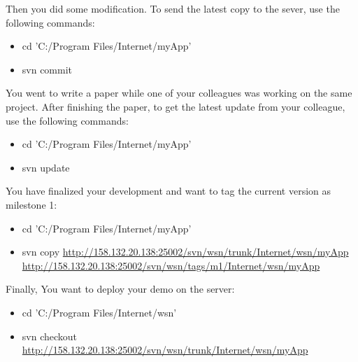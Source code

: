 Then you did some modification. To send the latest copy to the sever, use the following commands:
\begin{itemize}
\item cd 'C:/Program Files/Internet/myApp'
\item svn commit
\end{itemize}

You went to write a paper while one of your colleagues was working on the same project. After finishing the paper, to get the latest update from your colleague, use the following commands:
\begin{itemize}
\item cd 'C:/Program Files/Internet/myApp'
\item svn update
\end{itemize}

You have finalized your development and want to tag the current version as milestone 1:
\begin{itemize}
\item cd 'C:/Program Files/Internet/myApp'
\item svn copy \url{http://158.132.20.138:25002/svn/wsn/trunk/Internet/wsn/myApp} \url{http://158.132.20.138:25002/svn/wsn/tags/m1/Internet/wsn/myApp}
\end{itemize}

Finally, You want to deploy your demo on the server:
\begin{itemize}
\item cd 'C:/Program Files/Internet/wsn'
\item svn checkout \url{http://158.132.20.138:25002/svn/wsn/trunk/Internet/wsn/myApp}
\end{itemize}